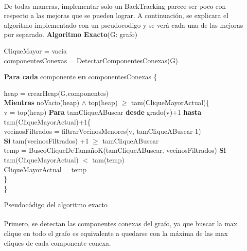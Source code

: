 \paragraph{}
De todas maneras, implementar solo un BackTracking parece ser poco con respecto a las mejoras que se pueden lograr. A continuación, 
se explicara el algoritmo implementado con un pseudocodigo y se verá cada una de las mejoras por separado.
\vspace{2em}
\incmargin{3em}
\linesnumbered
{}
\footnotesize 
\textbf{Algoritmo Exacto}(G: grafo) \\
\begin{algorithm}[H]
	\BlankLine
		CliqueMayor = vacia\\
		componentesConexas = DetectarComponentesConexas(G)
		\BlankLine

		\textbf{Para cada} componente \textbf{en} componentesConexas \{ 
		\BlankLine

		\tab\tab heap = crearHeap(G,componentes) \\

		\BlankLine
		\tab\tab \textbf{Mientras} noVacio(heap) $\wedge$ top(heap) $\geq$ tam(CliqueMayorActual)\{\\
		\BlankLine
		\tab\tab\tab v = top(heap)
		\BlankLine
		\tab\tab\tab \textbf{Para} tamCliqueABuscar \textbf{desde} grado(v)+1 \textbf{hasta} tam(CliqueMayorActual)+1\{\\
		\tab\tab\tab\tab vecinosFiltrados = 	filtrarVecinosMenores(v, tamCliqueABuscar-1)\\						
		\tab\tab\tab\tab \textbf{Si} tam(vecinosFiltrados) +1 $\geq$ tamCliqueABuscar\\ 			
		\tab\tab\tab\tab\tab temp = BuscoCliqueDeTamañoK(tamCliqueABuscar, vecinosFiltrados)
		\BlankLine
		\tab\tab\tab\tab\tab \textbf{Si}  tam(CliqueMayorActual)  $<$ tam(temp)\\ 
		\tab\tab\tab\tab\tab\tab CliqueMayorActual  = temp\\
		\tab\tab\tab\}\\
		\tab\tab\}
\caption{Pseudocódigo del algoritmo exacto}
\end{algorithm}

\normalsize

\paragraph{}
Primero, se detectan las componentes conexas del grafo, ya que buscar la max clique en todo el grafo es equivalente a quedarse con la máxima de las max cliques de cada componente conexa.

